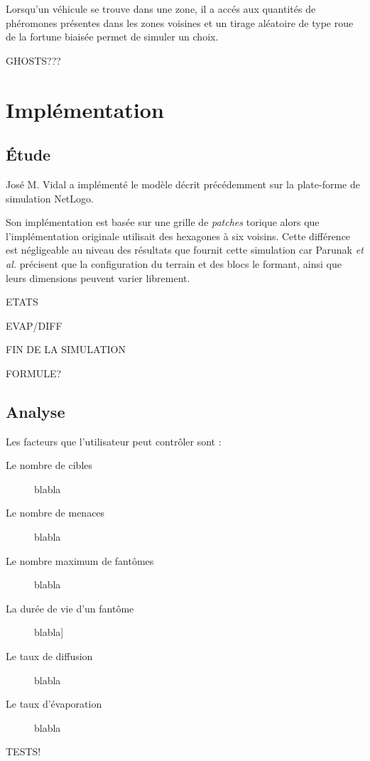 \documentclass[12pt]{article}
\begin{document}
Lorsqu'un véhicule se trouve dans une zone, il a accés aux quantités
de phéromones présentes dans les zones voisines et un tirage aléatoire
de type roue de la fortune biaisée permet de simuler un choix.

GHOSTS???

\section{Implémentation}

\subsection{\'Etude}

José M. Vidal a implémenté le modèle décrit précédemment sur la
plate-forme de simulation NetLogo.

Son implémentation est basée sur une grille de \textit{patches}
torique alors que l'implémentation originale utilisait des hexagones à
six voisins. Cette différence est négligeable au niveau des résultats
que fournit cette simulation car Parunak \textit{et al.} précisent que
la configuration du terrain et des blocs le formant, ainsi que leurs
dimensions peuvent varier librement.

ETATS

EVAP/DIFF

FIN DE LA SIMULATION

FORMULE?

\subsection{Analyse}

Les facteurs que l'utilisateur peut contrôler sont :

\begin{description}
\item[Le nombre de cibles]{blabla}
\item[Le nombre de menaces]{blabla}
\item[Le nombre maximum de fantômes]{blabla}
\item[La durée de vie d'un fantôme]{blabla}]
\item[Le taux de diffusion]{blabla}
\item[Le taux d'évaporation]{blabla}
\end{description}

TESTS!

 
\end{document}
